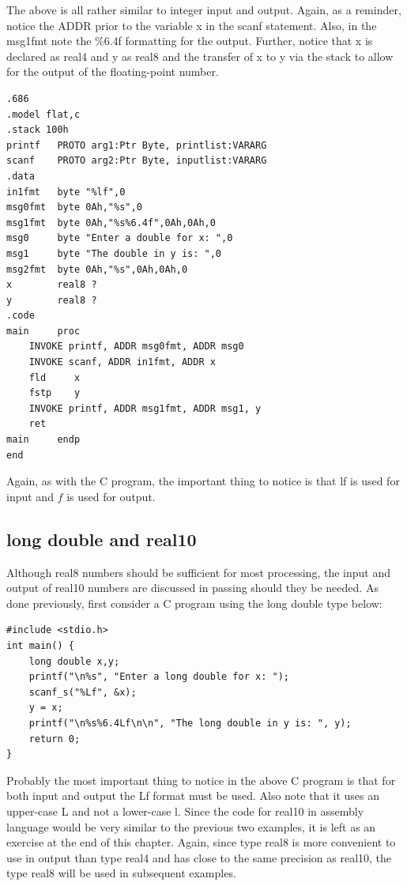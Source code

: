 \documentclass[10pt]{book}
\begin{document}
The above is all rather similar to integer input and output. Again, as a reminder, notice the ADDR prior to the variable x in the scanf statement. Also, in the msg1fmt note the \%6.4f formatting for the output. Further, notice that x is declared as real4 and y as real8 and the transfer of x to y via the stack to allow for the output of the floating-point number.
\begin{verbatim}
.686
.model flat,c
.stack 100h
printf   PROTO arg1:Ptr Byte, printlist:VARARG
scanf    PROTO arg2:Ptr Byte, inputlist:VARARG
.data
in1fmt   byte "%lf",0
msg0fmt  byte 0Ah,"%s",0
msg1fmt  byte 0Ah,"%s%6.4f",0Ah,0Ah,0
msg0     byte "Enter a double for x: ",0
msg1     byte "The double in y is: ",0
msg2fmt  byte 0Ah,"%s",0Ah,0Ah,0
x        real8 ?
y        real8 ?
.code
main     proc
    INVOKE printf, ADDR msg0fmt, ADDR msg0
    INVOKE scanf, ADDR in1fmt, ADDR x
    fld     x
    fstp    y
    INVOKE printf, ADDR msg1fmt, ADDR msg1, y
    ret
main     endp
end
\end{verbatim}

Again, as with the C program, the important thing to notice is that lf is used for input and $f$ is used for output.

\subsection{long double and real10}
Although real8 numbers should be sufficient for most processing, the input and output of real10 numbers are discussed in passing should they be needed. As done previously, first consider a C program using the long double type below:

\begin{verbatim}
#include <stdio.h>
int main() {
    long double x,y;
    printf("\n%s", "Enter a long double for x: ");
    scanf_s("%Lf", &x);
    y = x;
    printf("\n%s%6.4Lf\n\n", "The long double in y is: ", y);
    return 0;
}
\end{verbatim}

Probably the most important thing to notice in the above C program is that for both input and output the Lf format must be used. Also note that it uses an upper-case L and not a lower-case l. Since the code for real10 in assembly language would be very similar to the previous two examples, it is left as an exercise at the end of this chapter. Again, since type real8 is more convenient to use in output than type real4 and has close to the same precision as real10, the type real8 will be used in subsequent examples.
\end{document}
